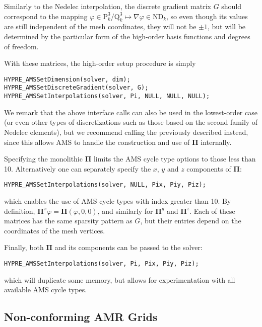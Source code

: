 Similarly to the Nedelec interpolation, the discrete gradient matrix $G$ should
correspond to the mapping $\varphi \in \mathrm{P}_k^3$/$\mathrm{Q}_k^3 \mapsto
\nabla \varphi \in \mathrm{ND}_k$, so even though its values are still
independent of the mesh coordinates, they will not be $\pm 1$, but will be
determined by the particular form of the high-order basis functions and degrees
of freedom.

With these matrices, the high-order setup procedure is simply
\begin{display}\begin{verbatim}
HYPRE_AMSSetDimension(solver, dim);
HYPRE_AMSSetDiscreteGradient(solver, G);
HYPRE_AMSSetInterpolations(solver, Pi, NULL, NULL, NULL);
\end{verbatim}\end{display}
We remark that the above interface calls can also be used in the lowest-order
case (or even other types of discretizations such as those based on the second
family of Nedelec elements), but we recommend calling the previously described
 instead, since this allows AMS to handle the
construction and use of ${\mathbf \Pi}$ internally.


Specifying the monolithic ${\mathbf \Pi}$ limits the AMS cycle type options to
those less than 10. Alternatively one can separately specify the $x$, $y$ and
$z$ components of $\mathbf \Pi$:
\begin{display}\begin{verbatim}
HYPRE_AMSSetInterpolations(solver, NULL, Pix, Piy, Piz);
\end{verbatim}\end{display}
which enables the use of AMS cycle types with index greater than 10. By
definition, ${\mathbf \Pi}^x \varphi = {\mathbf \Pi} (\varphi,0,0)$, and
similarly for ${\mathbf \Pi}^y$ and ${\mathbf \Pi}^z$. Each of these matrices
has the same sparsity pattern as $G$, but their entries depend on the
coordinates of the mesh vertices.

Finally, both ${\mathbf \Pi}$ and its components can be passed to the solver:
\begin{display}\begin{verbatim}
HYPRE_AMSSetInterpolations(solver, Pi, Pix, Piy, Piz);
\end{verbatim}\end{display}
which will duplicate some memory, but allows for experimentation with all
available AMS cycle types.

\subsection{Non-conforming AMR Grids}

